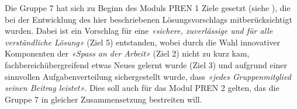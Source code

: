 Die Gruppe 7 hat sich zu Beginn des Moduls PREN 1 Ziele gesetzt (siehe ), die bei der Entwicklung des hier beschriebenen Lösungsvorschlags mitberücksichtigt wurden. Dabei ist ein Vorschlag für eine \textit{«sichere, zuverlässige und für alle verständliche Lösung»} (Ziel 5) entstanden, wobei durch die Wahl innovativer Komponenten der \textit{«Spass an der Arbeit»} (Ziel 2) nicht zu kurz kam, fachbereichübergreifend etwas Neues gelernt wurde (Ziel 3) und aufgrund einer sinnvollen Aufgabenverteilung sichergestellt wurde, dass \textit{«jedes Gruppenmitglied seinen Beitrag leistet»}. Dies soll auch für das Modul PREN 2 gelten, das die Gruppe 7 in gleicher Zusammensetzung bestreiten will.
